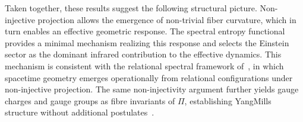   Taken together, these results suggest the following structural picture.
  Non-injective projection allows the emergence of non-trivial fiber curvature,
  which in turn enables an effective geometric response.
  The spectral entropy functional provides a minimal mechanism realizing this
  response and selects the Einstein sector as the dominant infrared contribution
  to the effective dynamics.
  This mechanism is consistent with the relational spectral framework
  of~\cite{Beau2026a}, in which spacetime geometry emerges operationally from
  relational configurations under non-injective projection.
  The same non-injectivity argument further yields gauge charges and gauge groups
  as fibre invariants of $\Pi$, establishing Yang\textendash Mills structure without
  additional postulates~\cite{Beau2026m}.
